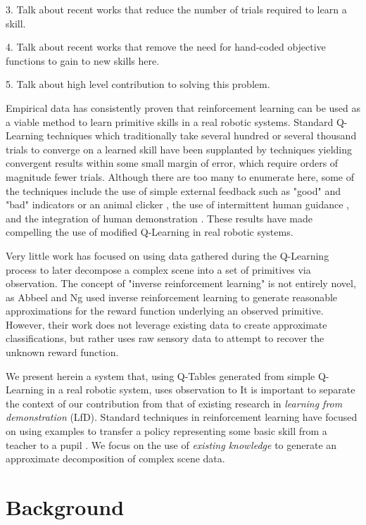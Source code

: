\documentclass[letterpaper]{article}
\begin{document}
3. Talk about recent works that reduce the number of trials required to learn a skill.

4. Talk about recent works that remove the need for hand-coded objective functions to gain to new skills here.

5. Talk about high level contribution to solving this problem.

Empirical data has consistently proven that reinforcement learning can be used
as a viable method to learn primitive skills in a real robotic systems.
Standard Q-Learning techniques which traditionally take several hundred or
several thousand trials to converge on a learned skill have been supplanted
by techniques yielding convergent results within some small margin of error,
which require orders of magnitude fewer trials.   Although there are too many
to enumerate here, some of the techniques include the use of simple external
feedback such as "good" and "bad" indicators \cite{TAMER} or an animal
clicker \cite{Clicker}, the use of intermittent human
guidance \cite{AdviceTaking,TeacherRL}, and the integration of human
demonstration \cite{DemonstrationRL}.  These results
have made compelling the use of modified Q-Learning in real robotic systems.

Very little work has focused on using data gathered during the Q-Learning
process to later decompose a complex scene into a set of primitives via
observation.  The concept of "inverse reinforcement learning" is not entirely
novel, as Abbeel and Ng \cite{InverseRL} used inverse reinforcement learning
to generate reasonable approximations for the reward function underlying an
observed primitive.  However, their work does not leverage existing data
to create approximate classifications, but rather uses raw sensory data to
attempt to recover the unknown reward function.

We present herein a system that, using Q-Tables generated from simple
Q-Learning in a real robotic system, uses observation to 
It is important to separate the context of our contribution from that of
existing research in \textit{learning from demonstration} (LfD).  Standard
techniques in reinforcement learning have focused on using examples to
transfer a policy representing some basic skill from a teacher to a
pupil \cite{JenkinsLFD,LFDSurvey}.  We focus on the use of
\textit{existing knowledge} to generate an approximate decomposition of
complex scene data.

\section{Background}
\label{sec:background}
\end{document}
